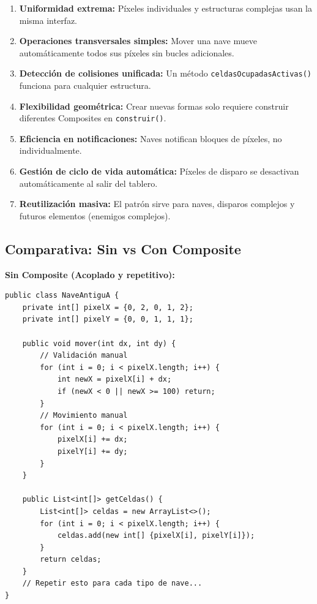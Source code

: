 \documentclass[12pt]{article}
\begin{document}
\begin{enumerate}
    \item \textbf{Uniformidad extrema:} Píxeles individuales y estructuras complejas usan la misma interfaz.
    
    \item \textbf{Operaciones transversales simples:} Mover una nave mueve automáticamente todos sus píxeles sin bucles adicionales.
    
    \item \textbf{Detección de colisiones unificada:} Un método \texttt{celdasOcupadasActivas()} funciona para cualquier estructura.
    
    \item \textbf{Flexibilidad geométrica:} Crear nuevas formas solo requiere construir diferentes Composites en \texttt{construir()}.
    
    \item \textbf{Eficiencia en notificaciones:} Naves notifican bloques de píxeles, no individualmente.
    
    \item \textbf{Gestión de ciclo de vida automática:} Píxeles de disparo se desactivan automáticamente al salir del tablero.
    
    \item \textbf{Reutilización masiva:} El patrón sirve para naves, disparos complejos y futuros elementos (enemigos complejos).
\end{enumerate}

\subsection{Comparativa: Sin vs Con Composite}

\textbf{Sin Composite (Acoplado y repetitivo):}

\begin{lstlisting}
public class NaveAntiguA {
    private int[] pixelX = {0, 2, 0, 1, 2};
    private int[] pixelY = {0, 0, 1, 1, 1};
    
    public void mover(int dx, int dy) {
        // Validación manual
        for (int i = 0; i < pixelX.length; i++) {
            int newX = pixelX[i] + dx;
            if (newX < 0 || newX >= 100) return;
        }
        // Movimiento manual
        for (int i = 0; i < pixelX.length; i++) {
            pixelX[i] += dx;
            pixelY[i] += dy;
        }
    }
    
    public List<int[]> getCeldas() {
        List<int[]> celdas = new ArrayList<>();
        for (int i = 0; i < pixelX.length; i++) {
            celdas.add(new int[] {pixelX[i], pixelY[i]});
        }
        return celdas;
    }
    // Repetir esto para cada tipo de nave...
}
\end{lstlisting}
\end{document}

